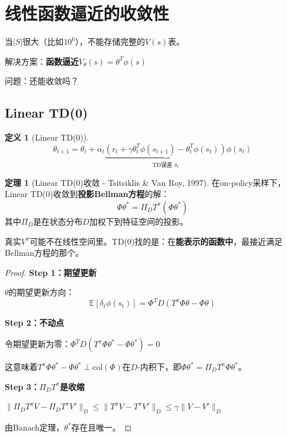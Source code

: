 \documentclass[11pt,a4paper]{article}
\theoremstyle{definition}
\newtheorem{definition}{定义}[section]
\newtheorem{theorem}{定理}[section]
\begin{document}
\section{线性函数逼近的收敛性}

\begin{plainwords}
当$|S|$很大（比如$10^6$），不能存储完整的$V(s)$表。

解决方案：\textbf{函数逼近}$V_\theta(s) = \theta^T \phi(s)$

问题：还能收敛吗？
\end{plainwords}

\subsection{Linear TD(0)}

\begin{definition}[Linear TD(0)]
\[
\theta_{t+1} = \theta_t + \alpha_t \underbrace{(r_t + \gamma \theta_t^T \phi(s_{t+1}) - \theta_t^T \phi(s_t))}_{\text{TD误差 } \delta_t} \phi(s_t)
\]
\end{definition}

\begin{theorem}[Linear TD(0)收敛 - Tsitsiklis \& Van Roy, 1997]
在on-policy采样下，Linear TD(0)收敛到\textbf{投影Bellman方程}的解：
\[
\Phi \theta^* = \Pi_D T^\pi (\Phi \theta^*)
\]
其中$\Pi_D$是在状态分布$D$加权下到特征空间的投影。
\end{theorem}

\begin{plainwords}[投影Bellman方程]
真实$V^\pi$可能不在线性空间里。TD(0)找的是：在\textbf{能表示的函数中}，最接近满足Bellman方程的那个。
\end{plainwords}

\begin{proof}
\textbf{Step 1：期望更新}

$\theta$的期望更新方向：
\[
\mathbb{E}[\delta_t \phi(s_t)] = \Phi^T D (T^\pi \Phi \theta - \Phi \theta)
\]

\textbf{Step 2：不动点}

令期望更新为零：$\Phi^T D (T^\pi \Phi \theta^* - \Phi \theta^*) = 0$

这意味着$T^\pi \Phi\theta^* - \Phi\theta^* \perp \text{col}(\Phi)$在$D$-内积下，即$\Phi\theta^* = \Pi_D T^\pi \Phi\theta^*$。

\textbf{Step 3：$\Pi_D T^\pi$是收缩}

$\|\Pi_D T^\pi V - \Pi_D T^\pi V'\|_D \leq \|T^\pi V - T^\pi V'\|_D \leq \gamma\|V-V'\|_D$

由Banach定理，$\theta^*$存在且唯一。
\end{proof}
\end{document}
